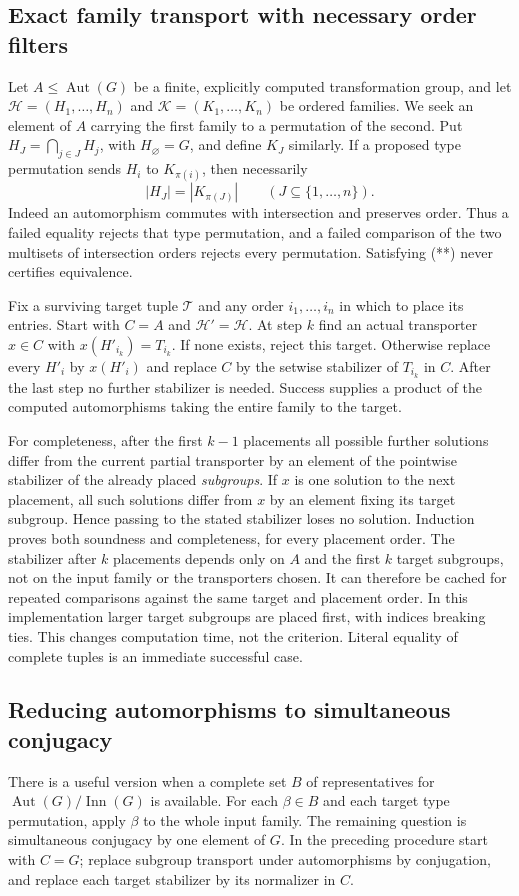 \subsection{Exact family transport with necessary order filters}
Let $A\leq\operatorname{Aut}(G)$ be a finite, explicitly computed
transformation group, and let $\mathcal H=(H_1,\ldots,H_n)$ and
$\mathcal K=(K_1,\ldots,K_n)$ be ordered families. We seek an element of
$A$ carrying the first family to a permutation of the second. Put
$H_J=\bigcap_{j\in J}H_j$, with $H_\varnothing=G$, and define $K_J$
similarly. If a proposed type permutation sends $H_i$ to $K_{\pi(i)}$,
then necessarily
\[
 |H_J|=|K_{\pi(J)}|\qquad(J\subseteq\{1,\ldots,n\}).       \tag{**}
\]
Indeed an automorphism commutes with intersection and preserves order.
Thus a failed equality rejects that type permutation, and a failed
comparison of the two multisets of intersection orders rejects every
permutation. Satisfying (**) never certifies equivalence.

Fix a surviving target tuple $\mathcal T$ and any order
$i_1,\ldots,i_n$ in which to place its entries. Start with $C=A$ and
$\mathcal H' =\mathcal H$. At step $k$ find an actual transporter
$x\in C$ with $x(H'_{i_k})=T_{i_k}$. If none exists, reject this target.
Otherwise replace every $H'_i$ by $x(H'_i)$ and replace $C$ by the
setwise stabilizer of $T_{i_k}$ in $C$. After the last step no further
stabilizer is needed. Success supplies a product of the computed
automorphisms taking the entire family to the target.

For completeness, after the first $k-1$ placements all possible further
solutions differ from the current partial transporter by an element of
the pointwise stabilizer of the already placed \emph{subgroups}. If $x$
is one solution to the next placement, all such solutions differ from
$x$ by an element fixing its target subgroup. Hence passing to the stated
stabilizer loses no solution. Induction proves both soundness and
completeness, for every placement order. The stabilizer after $k$
placements depends only on $A$ and the first $k$ target subgroups, not on
the input family or the transporters chosen. It can therefore be cached
for repeated comparisons against the same target and placement order.
In this implementation larger target subgroups are placed first, with
indices breaking ties. This changes computation time, not the criterion.
Literal equality of complete tuples is an immediate successful case.

\subsection{Reducing automorphisms to simultaneous conjugacy}
There is a useful version when a complete set $B$ of representatives
for $\operatorname{Aut}(G)/\operatorname{Inn}(G)$ is available. For each
$\beta\in B$ and each target type permutation, apply $\beta$ to the
whole input family. The remaining question is simultaneous conjugacy
by one element of $G$. In the preceding procedure start with $C=G$;
replace subgroup transport under automorphisms by conjugation, and
replace each target stabilizer by its normalizer in $C$.


